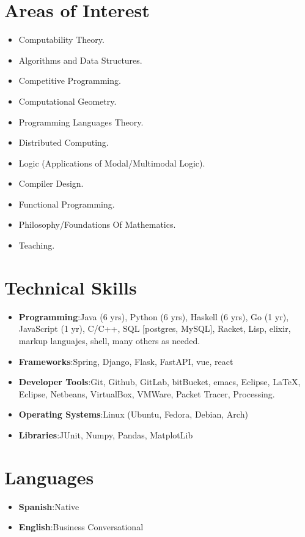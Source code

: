 \documentclass[letterpaper,
  10pt]{article}
\newcommand{\resumeHeadingSkillStart}{\begin{itemize}[leftmargin=*,itemsep=.5mm, rightmargin=2ex, label={}]}
\newcommand{\resumeHeadingSkillEnd}{\end{itemize}\vspace{-2mm}}
\newcommand{\resumeSubItem}[2]{\resumeItem{#1}{#2}\vspace{-4pt}}
\newcommand{\resumeItem}[2]{
  \item{
    \textbf{#1}{:\hspace{0.5mm}#2 \vspace{-0.5mm}}
  }
}
\begin{document}
\section{Areas of Interest}
\vspace{-2.4mm}
\begin{multicols}{2}
  \begin{itemize}[leftmargin=*,itemsep=.5mm, rightmargin=2ex]
  \item Computability Theory.
  \item Algorithms and Data Structures.
  \item Competitive Programming.
  \item Computational Geometry.
  \item Programming Languages Theory.
  \item Distributed Computing.
  \item Logic (Applications of Modal/Multimodal Logic).
  \item Compiler Design.
  \item Functional Programming.
  \item Philosophy/Foundations Of Mathematics.
  \item Teaching.
  \end{itemize}
\end{multicols}
\vspace{-3mm}

\section{Technical Skills}

\resumeHeadingSkillStart
  \resumeSubItem{Programming}
                {Java (6 yrs), Python (6 yrs), Haskell (6 yrs), Go (1 yr), JavaScript (1 yr), C/C++, SQL [postgres, MySQL], Racket, Lisp, elixir, markup languajes, shell, many others as needed.}
  \resumeSubItem{Frameworks}
                {Spring, Django, Flask, FastAPI, vue, react}
  \resumeSubItem{Developer Tools}
                {Git, Github, GitLab, bitBucket, emacs, Eclipse, \LaTeX, Eclipse, Netbeans, VirtualBox, VMWare, Packet Tracer, Processing.}
  \resumeSubItem{Operating Systems}
                {Linux (Ubuntu, Fedora, Debian, Arch)}
  \resumeSubItem{Libraries}
                {JUnit, Numpy, Pandas, MatplotLib}
\resumeHeadingSkillEnd

\section{Languages}
\resumeHeadingSkillStart
  \resumeSubItem{Spanish}
                {Native}
\resumeSubItem{English}
              {Business Conversational}
 \resumeHeadingSkillEnd
\end{document}
